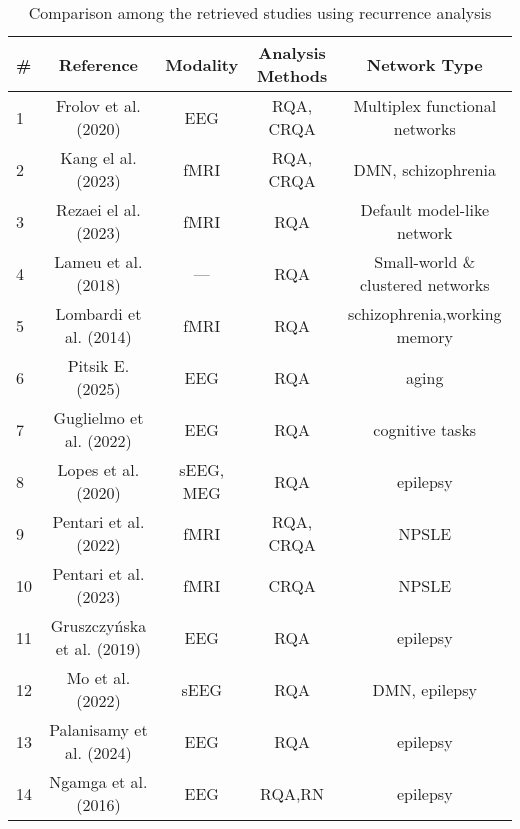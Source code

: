 \documentclass{article}
\begin{document}
\begin{table}[h]
\centering
\caption{Comparison among the retrieved studies using recurrence analysis}
\label{tab:comparison}
\begin{tabular}{@{}lcccc@{}}
\toprule
\# & Reference & Modality & Analysis Methods & Network Type \\
\midrule

1  & Frolov et al. (2020) & EEG & RQA, CRQA & Multiplex functional networks \\
2  & Kang el al. (2023) & fMRI & RQA, CRQA & DMN, schizophrenia \\
3  & Rezaei el al. (2023) & fMRI & RQA & Default model-like network \\
4  & Lameu et al. (2018) & --- & RQA & Small-world \& clustered networks \\
5  & Lombardi et al. (2014) & fMRI & RQA & schizophrenia,working memory \\
6  & Pitsik E. (2025) & EEG & RQA & aging \\
7  & Guglielmo et al. (2022) & EEG & RQA & cognitive tasks \\
8  & Lopes et al. (2020) & sEEG, MEG & RQA & epilepsy \\
9  & Pentari et al. (2022) & fMRI & RQA, CRQA & NPSLE \\
10 & Pentari et al. (2023) & fMRI & CRQA & NPSLE  \\
11 & Gruszczyńska et al. (2019) & EEG & RQA & epilepsy \\
12 & Mo et al. (2022) & sEEG & RQA & DMN, epilepsy \\
13 & Palanisamy et al. (2024) & EEG & RQA & epilepsy \\
14 & Ngamga et al. (2016) & EEG & RQA,RN & epilepsy \\

\bottomrule
\end{tabular}
\end{table}

\newpage


\end{document}
